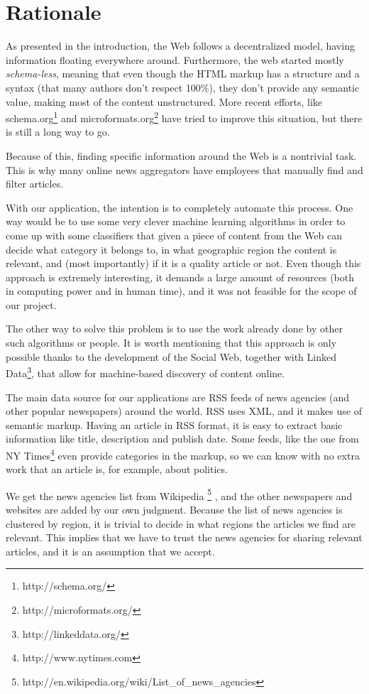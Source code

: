 \documentclass{acm_proc_10ptArticle-sp}
\begin{document}
\section{Rationale}

As presented in the introduction, the Web follows a decentralized model, having information floating everywhere around. Furthermore, the web started mostly \textit{schema-less}, meaning that even though the HTML markup has a structure and a syntax (that many authors don't respect 100\%), they don't provide any semantic value, making most of the content unstructured. More recent efforts, like schema.org\footnote{http://schema.org/} and microformats.org\footnote{http://microformats.org/} have tried to improve this situation, but there is still a long way to go.

Because of this, finding specific information around the Web is a nontrivial task. This is why many online news aggregators have employees that manually find and filter articles.

With our application, the intention is to completely automate this process. One way would be to use some very clever machine learning algorithms in order to come up with some classifiers that given a piece of content from the Web can decide what category it belongs to, in what geographic region the content is relevant, and (most importantly) if it is a quality article or not. Even though this approach is extremely interesting, it demands a large amount of resources (both in computing power and in human time), and it was not feasible for the scope of our project.

The other way to solve this problem is to use the work already done by other such algorithms or people. It is worth mentioning that this approach is only possible thanks to the development of the Social Web, together with Linked Data\footnote{http://linkeddata.org/}, that allow for machine-based discovery of content online.

The main data source for our applications are RSS feeds of news agencies (and other popular newspapers) around the world. RSS uses XML, and it makes use of semantic markup. Having an article in RSS format, it is easy to extract basic information like title, description and publish date. Some feeds, like the one from NY Times\footnote{http://www.nytimes.com} even provide categories in the markup, so we can know with no extra work that an article is, for example, about politics.

We get the news agencies list from Wikipedia \footnote{http://en.wikipedia.org/wiki/List\_of\_news\_agencies}
, and the other newspapers and websites are added by our own judgment. Because the list of news agencies is clustered by region, it is trivial to decide in what regions the articles we find are relevant. This implies that we have to trust the news agencies for sharing relevant articles, and it is an assumption that we accept.
\end{document}
